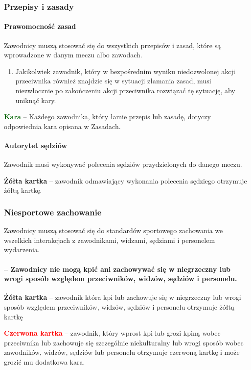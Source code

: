 \documentclass[12pt]{article}
\newcommand\redcard[1]{\bgroup\textcolor{red}{\textbf{#1}}}
\newcommand\yellowcard[1]{\bgroup\textcolor{darkyellow}{\textbf{#1}}}
\newcommand\other[1]{\bgroup\textcolor{darkgreen}{\textbf{#1}}}
\begin{document}
\subsubsection{Przepisy i zasady}

\paragraph{Prawomocność zasad}
Zawodnicy muszą stosować się do
wszystkich przepisów i zasad, które są wprowadzone w danym meczu albo
zawodach.
\begin{enumerate}
	\item Jakikolwiek zawodnik, który w bezpośrednim wyniku niedozwolonej akcji
	      przeciwnika również znajdzie się w sytuacji złamania zasad, musi
	      niezwłocznie po zakończeniu akcji przeciwnika rozwiązać tę sytuację, aby
	      uniknąć kary.
\end{enumerate}

\other{Kara} -- Każdego zawodnika, który łamie przepis lub zasadę, dotyczy
odpowiednia kara opisana w Zasadach.

\paragraph{Autorytet sędziów}
Zawodnik musi wykonywać polecenia
sędziów przydzielonych do danego meczu.

\yellowcard{Żółta kartka} -- zawodnik odmawiający wykonania polecenia sędziego
otrzymuje żółtą kartkę.

\subsubsection{Niesportowe zachowanie}

Zawodnicy muszą stosować się do standardów sportowego zachowania we
wszelkich interakcjach z zawodnikami, widzami, sędziami i personelem
wydarzenia.

\paragraph{-- Zawodnicy nie mogą kpić ani zachowywać się w
	niegrzeczny lub wrogi sposób względem przeciwników, widzów, sędziów i
	personelu.}

\yellowcard{Żółta kartka} -- zawodnik która kpi lub zachowuje się w niegrzeczny
lub wrogi sposób względem przeciwników, widzów, sędziów i personelu
otrzymuje żółtą kartkę

\redcard{Czerwona kartka} -- zawodnik, który wprost kpi lub grozi kpiną
wobec przeciwnika lub zachowuje się szczególnie niekulturalny lub wrogi
sposób wobec zawodników, widzów, sędziów lub personelu otrzymuje
czerwoną kartkę i może grozić mu dodatkowa kara.
\end{document}
